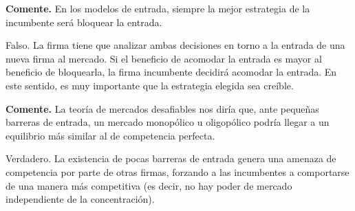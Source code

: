 \question \textbf{Comente.} En los modelos de entrada, siempre la mejor estrategia de la incumbente será bloquear la entrada.
\begin{solution}
Falso. La firma tiene que analizar ambas decisiones en torno a la entrada de una nueva firma al mercado. Si el beneficio de acomodar la entrada es mayor al beneficio de bloquearla, la firma incumbente decidirá acomodar la entrada. En este sentido, es muy importante que la estrategia elegida sea creíble.

\end{solution}

\question \textbf{Comente.} La teoría de mercados desafiables nos diría que, ante pequeñas barreras de entrada, un mercado monopólico u oligopólico podría llegar a un equilibrio más similar al de competencia perfecta.
\begin{solution}
Verdadero. La existencia de pocas barreras de entrada genera una amenaza de competencia por parte de otras firmas, forzando a las incumbentes a comportarse de una manera más competitiva (es decir, no hay poder de mercado independiente de la concentración).

\end{solution}

